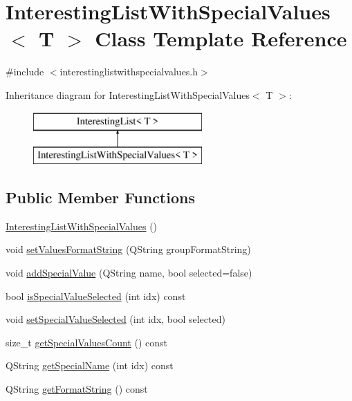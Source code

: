 \hypertarget{class_interesting_list_with_special_values}{}\section{Interesting\+List\+With\+Special\+Values$<$ T $>$ Class Template Reference}
\label{class_interesting_list_with_special_values}


{\ttfamily \#include $<$interestinglistwithspecialvalues.\+h$>$}

Inheritance diagram for Interesting\+List\+With\+Special\+Values$<$ T $>$\+:\begin{figure}[H]
\begin{center}
\leavevmode
\includegraphics[height=2.000000cm]{d4/d9f/class_interesting_list_with_special_values}
\end{center}
\end{figure}
\subsection*{Public Member Functions}
\begin{DoxyCompactItemize}
\item 
\mbox{\hyperlink{class_interesting_list_with_special_values_aac8922008e54bc7e28a392b1b85ead37}{Interesting\+List\+With\+Special\+Values}} ()
\item 
void \mbox{\hyperlink{class_interesting_list_with_special_values_ad715bd4c8218c178fc0911ff0c60a8aa}{set\+Values\+Format\+String}} (Q\+String group\+Format\+String)
\item 
void \mbox{\hyperlink{class_interesting_list_with_special_values_a775cdd5ee99c643ebec718f41477d821}{add\+Special\+Value}} (Q\+String name, bool selected=false)
\item 
bool \mbox{\hyperlink{class_interesting_list_with_special_values_a00bd1929e768dfbbe10bde65ea2f3424}{is\+Special\+Value\+Selected}} (int idx) const
\item 
void \mbox{\hyperlink{class_interesting_list_with_special_values_ac285c42925498992d4ec15911c6f926b}{set\+Special\+Value\+Selected}} (int idx, bool selected)
\item 
size\+\_\+t \mbox{\hyperlink{class_interesting_list_with_special_values_a841b8a2c933ec1f8b6f93ab895b44bac}{get\+Special\+Values\+Count}} () const
\item 
Q\+String \mbox{\hyperlink{class_interesting_list_with_special_values_a9bcfb2ff742964f44d1758659d3bc559}{get\+Special\+Name}} (int idx) const
\item 
Q\+String \mbox{\hyperlink{class_interesting_list_with_special_values_a81e231bbeb3442f8287329af80f9325a}{get\+Format\+String}} () const
\end{DoxyCompactItemize}


